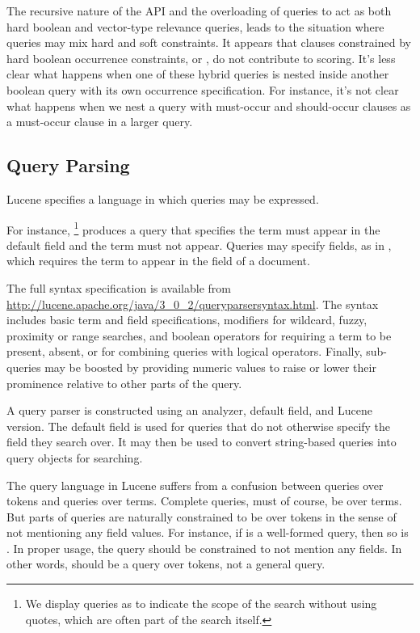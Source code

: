 The recursive nature of the API and the overloading of queries to act
as both hard boolean and vector-type relevance queries, leads to the
situation where queries may mix hard and soft constraints.  It appears
that clauses constrained by hard boolean occurrence constraints,
 or , do not contribute to scoring.  It's
less clear what happens when one of these hybrid queries is nested
inside another boolean query with its own occurrence specification.
For instance, it's not clear what happens when we nest a query with
must-occur and should-occur clauses as a must-occur clause in a larger
query.
%


\subsection{Query Parsing}

Lucene specifies a language in which queries may be expressed.  

For instance, %
%
\footnote{We display queries  as  to
indicate the scope of the search without using quotes, which are often
part of the search itself.}
%
produces a query that specifies the term  must
appear in the default field and the term  must not
appear.  Queries may specify fields, as in ,
which requires the term  to appear in the
 field of a document.

The full syntax specification is available from
\url{http://lucene.apache.org/java/3_0_2/queryparsersyntax.html}.  The
syntax includes basic term and field specifications, modifiers for
wildcard, fuzzy, proximity or range searches, and boolean operators
for requiring a term to be present, absent, or for combining queries
with logical operators.  Finally, sub-queries may be boosted by providing
numeric values to raise or lower their prominence relative to other
parts of the query.

A query parser is constructed using an analyzer, default field, and
Lucene version.  The default field is used for queries that do not
otherwise specify the field they search over.  It may then be used to
convert string-based queries into query objects for searching.

The query language in Lucene suffers from a confusion between queries
over tokens and queries over terms.  Complete queries, must of course,
be over terms.  But parts of queries are naturally constrained to be
over tokens in the sense of not mentioning any field values.  For
instance, if  is a well-formed query, then so is
.  In proper usage, the query  should
be constrained to not mention any fields.  In other words, 
should be a query over tokens, not a general query.


